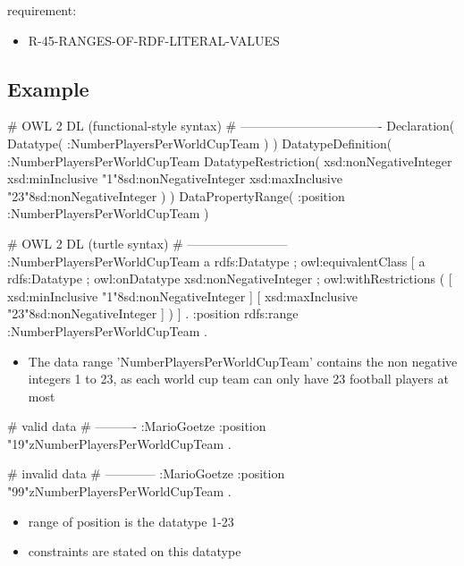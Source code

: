 \documentclass{llncs}
\begin{document}
requirement:

\begin{itemize}
	\item R-45-RANGES-OF-RDF-LITERAL-VALUES
\end{itemize}



\subsection{Example}

\begin{ex}
# OWL 2 DL (functional-style syntax)
# ----------------------------------
Declaration( Datatype( :NumberPlayersPerWorldCupTeam ) ) 
DatatypeDefinition( 
    :NumberPlayersPerWorldCupTeam
    DatatypeRestriction( 
        xsd:nonNegativeInteger 
        xsd:minInclusive "1"^^xsd:nonNegativeInteger 
        xsd:maxInclusive "23"^^xsd:nonNegativeInteger ) )     
DataPropertyRange( :position :NumberPlayersPerWorldCupTeam ) 
\end{ex}

\begin{ex}
# OWL 2 DL (turtle syntax)
# ------------------------
:NumberPlayersPerWorldCupTeam
    a rdfs:Datatype ;
    owl:equivalentClass [
        a rdfs:Datatype ;
        owl:onDatatype xsd:nonNegativeInteger ;
        owl:withRestrictions ( 
            [ xsd:minInclusive "1"^^xsd:nonNegativeInteger ]
            [ xsd:maxInclusive "23"^^xsd:nonNegativeInteger ] ) ] .
:position rdfs:range :NumberPlayersPerWorldCupTeam .
\end{ex}

\begin{itemize}
	\item The data range 'NumberPlayersPerWorldCupTeam' contains the non negative integers 1 to 23, as each world cup team can only have 23 football players at most
\end{itemize}

\begin{ex}
# valid data
# ----------
:MarioGoetze
    :position "19"^^:NumberPlayersPerWorldCupTeam .
\end{ex}

\begin{ex}
# invalid data
# ------------
:MarioGoetze
    :position "99"^^:NumberPlayersPerWorldCupTeam .
\end{ex}

\begin{itemize}
	\item range of position is the datatype 1-23
  \item constraints are stated on this datatype
\end{itemize}
\end{document}
